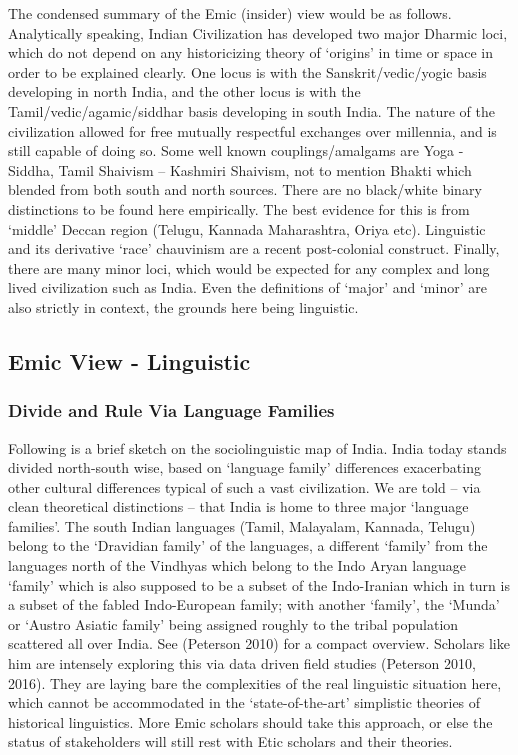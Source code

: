 The condensed summary of the Emic (insider) view would be as follows. Analytically speaking, Indian Civilization has developed two major Dharmic loci, which do not depend on any historicizing theory of ‘origins’ in time or space in order to be explained clearly. One locus is with the Sanskrit/vedic/yogic basis developing in north India, and the other locus is with the Tamil/vedic/agamic/siddhar basis developing in south India. The nature of the civilization allowed for free mutually respectful exchanges over millennia, and is still capable of doing so. Some well known couplings/amalgams are Yoga - Siddha, Tamil Shaivism – Kashmiri Shaivism, not to mention Bhakti which blended from both south and north sources. There are no black/white binary distinctions to be found here empirically. The best evidence for this is from ‘middle’ Deccan region (Telugu, Kannada Maharashtra, Oriya etc). Linguistic and its derivative ‘race’ chauvinism are a recent post-colonial construct. Finally, there are many minor loci, which would be expected for any complex and long lived civilization such as India. Even the definitions of ‘major’ and ‘minor’ are also strictly in context, the grounds here being linguistic.

\subsection*{Emic View - Linguistic}

\vskip -8pt

\subsubsection*{Divide and Rule Via Language Families}

\vskip -8pt

Following is a brief sketch on the sociolinguistic map of India. India today stands divided north-south wise, based on ‘language family’ differences exacerbating other cultural differences typical of such a vast civilization. We are told – via clean theoretical distinctions – that India is home to three major ‘language families’. The south Indian languages (Tamil, Malayalam, Kannada, Telugu) belong to the ‘Dravidian family’ of the languages, a different ‘family’ from the languages north of the Vindhyas which belong to the Indo Aryan language ‘family’ which is also supposed to be a subset of the Indo-Iranian which in turn is a subset of the fabled Indo-European family; with another ‘family’, the ‘Munda’ or ‘Austro Asiatic family’ being assigned roughly to the tribal population scattered all over India. See (Peterson 2010) for a compact overview. Scholars like him are intensely exploring this via data driven field studies (Peterson 2010, 2016). They are laying bare the complexities of the real linguistic situation here, which cannot be accommodated in the ‘state-of-the-art’ simplistic theories of historical linguistics. More Emic scholars should take this approach, or else the status of stakeholders will still rest with Etic scholars and their theories.

